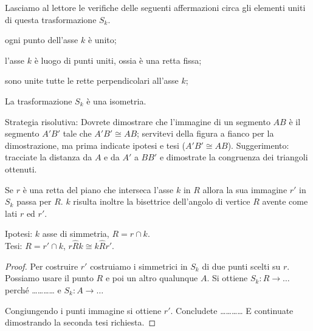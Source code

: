 

Lasciamo al lettore le verifiche delle seguenti affermazioni circa 
gli elementi uniti di questa trasformazione $S_k$.
\begin{itemize*}
\item ogni punto dell'asse $k$ è unito;
\item l'asse $k$ è luogo di punti uniti, ossia è una retta fissa;
\item sono unite tutte le rette perpendicolari all'asse $k$;
\end{itemize*}
\setlength{\intextsep}{\defintextsep}

\begin{teorema}\label{teo:8.3}
La trasformazione $S_k$ è una isometria.
\end{teorema}

\noindent\begin{minipage}{0.65\textwidth}\parindent15pt
Strategia risolutiva:
Dovrete dimostrare che l'immagine di un segmento $AB$ è il segmento 
$A'B'$ tale che $A'B'\cong AB$; servitevi della figura a fianco per 
la dimostrazione, ma prima indicate ipotesi e tesi ($A'B'\cong AB$).
Suggerimento: tracciate la distanza da $A$ e da $A'$ a $BB'$ e 
dimostrate la congruenza dei triangoli ottenuti.
\end{minipage}\hfil
\begin{minipage}{0.35\textwidth}
  \centering
\end{minipage}\vspace{5pt}

\begin{teorema}\label{teo:8.4}
Se $r$ è una retta del piano che interseca l'asse $k$ in $R$ allora 
la sua immagine $r'$ in $S_k$ passa per $R$. $k$ risulta inoltre la 
bisettrice dell'angolo di vertice $R$ avente come lati $r$ ed $r'$.
\end{teorema}

\noindent\begin{minipage}{0.65\textwidth}\parindent15pt
\noindent Ipotesi: $k$ asse di simmetria, $R=r\cap k$.\\
Tesi: $R=r'\cap k$, $r\widehat{R}k\cong k\widehat{R}r'$.

\begin{proof}
Per costruire $r'$ costruiamo i simmetrici in $S_k$ di due punti 
scelti su $r$. Possiamo usare il punto $R$ e poi un altro qualunque 
$A$. Si ottiene $S_k: R \rightarrow \ldots{}$ perché 
\ldots\ldots\ldots\ldots{} e $S_k: A \rightarrow \ldots{}$

Congiungendo i punti immagine si ottiene $r'$. Concludete 
\ldots\ldots\ldots\ldots{}
E continuate dimostrando la seconda tesi richiesta.
\end{proof}
\end{minipage}\hfil
\begin{minipage}{0.35\textwidth}
  \centering
\end{minipage}\vspace{5pt}

